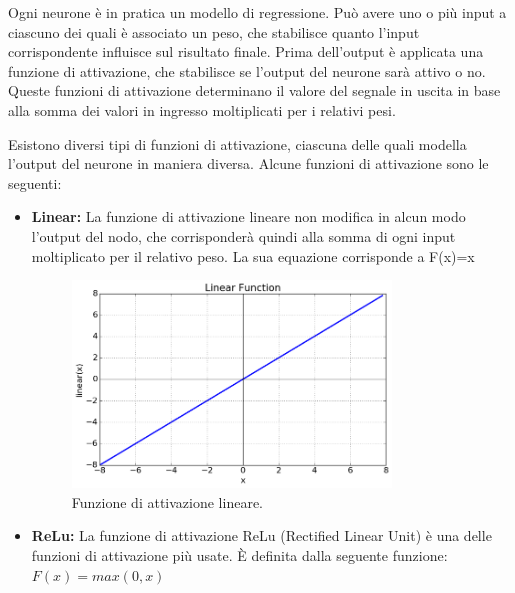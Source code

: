 \documentclass[12pt,a4paper,twoside,openright]{book}
\begin{document}
Ogni neurone è in pratica un modello di regressione. Può avere uno o più input a ciascuno dei quali è associato un peso, che stabilisce quanto l’input corrispondente influisce sul risultato finale. Prima dell’output è applicata una funzione di attivazione, che stabilisce se l’output del neurone sarà attivo o no. Queste funzioni di attivazione determinano il valore del segnale in uscita in base alla somma dei valori in ingresso moltiplicati per i relativi pesi.

Esistono diversi tipi di funzioni di attivazione, ciascuna delle quali modella l’output del neurone in maniera diversa. 
Alcune funzioni di attivazione sono le seguenti:
\begin{itemize}
    \item \textbf{Linear:} La funzione di attivazione lineare non modifica in alcun modo l’output del nodo, che corrisponderà quindi alla somma di ogni input moltiplicato per il relativo peso. La sua equazione corrisponde a F(x)=x
    
    \begin{figure}[H]
    \centering
    \includegraphics[width=0.8\textwidth]{images/linear.png}
    \caption{Funzione di attivazione lineare.}
    \label{fig:rapp_file}
    \end{figure}
    
    \item \textbf{ReLu:} La funzione di attivazione ReLu (Rectified Linear Unit) è una delle funzioni di attivazione più usate. È definita dalla seguente funzione: 
    \begin{math}
        F\left ( x \right ) = max\left ( 0,x \right )
    \end{math}
   

\end{itemize}
\end{document}
